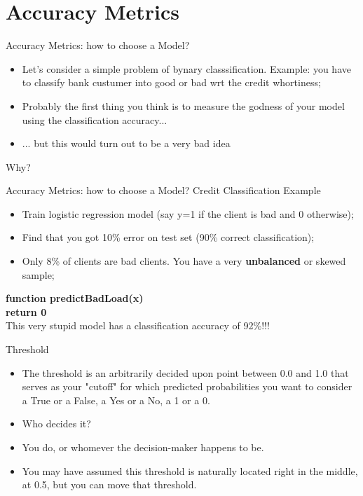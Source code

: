 \documentclass[11pt]{beamer}
\begin{document}
\section{Accuracy Metrics}
%
\begin{frame}{Accuracy Metrics: how to choose a Model?}
	\begin{itemize}
		\item Let's consider a simple problem of bynary classsification. Example: you have to classify bank custumer into good or bad wrt the credit whortiness;
		\item Probably the first thing you think is to measure the godness of your model using the classification accuracy...
		\item ... but this would turn out to be a very bad idea

	\end{itemize}
	\vspace{1.5cm}
	Why?
\end{frame}
\begin{frame}{Accuracy Metrics: how to choose a Model?}
Credit Classification Example
\begin{itemize}
		\item Train logistic regression model (say y=1 if the client is bad and 0 otherwise);
\item Find that you got 10\% error on test set (90\% correct classification);
\item Only 8\% of clients are bad clients. You have a very \textbf{unbalanced} or skewed sample;
\end{itemize}
\vspace{0.5cm}
\textbf{function predictBadLoad(x)\\}
\textbf{\hspace{1cm} return 0\\}
\vspace{0.5cm}
This very stupid model has a classification accuracy of 92\%!!!

\end{frame}
\begin{frame}{Threshold}
	\begin{itemize}
		\item The threshold is an arbitrarily decided upon point between 0.0 and 1.0 that serves as your "cutoff" for which predicted probabilities you want to consider a True or a False, a Yes or a No, a 1 or a 0. 
		\item Who decides it? 
		\item You do, or whomever the decision-maker happens to be. 
		\item You may have assumed this threshold is naturally located right in the middle, at 0.5, but you can move that threshold.
	\end{itemize}
\end{frame}
\end{document}
